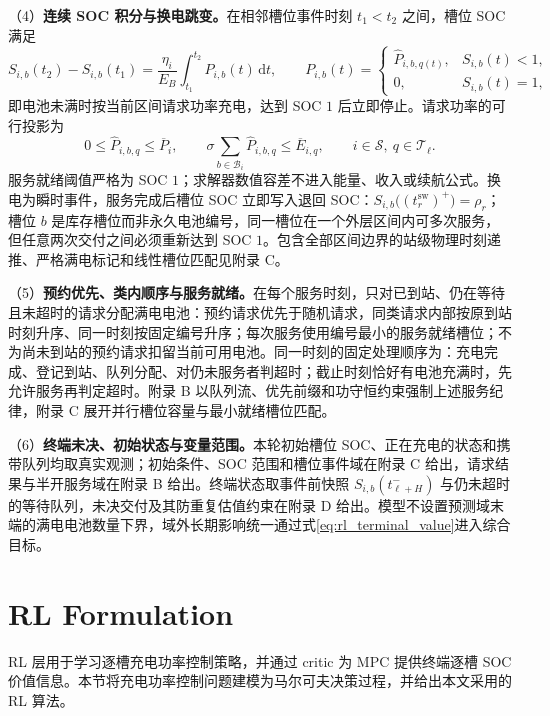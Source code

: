 \documentclass[12pt,a4paper,UTF8]{ctexart}
\begin{document}
（4）\textbf{连续 SOC 积分与换电跳变。}在相邻槽位事件时刻 $t_1<t_2$ 之间，槽位 SOC 满足
\begin{equation}
S_{i,b}(t_2)-S_{i,b}(t_1)
=
\frac{\eta_i}{E_B}
\int_{t_1}^{t_2}P_{i,b}(t)\,\mathrm dt,
\qquad
P_{i,b}(t)=
\begin{cases}
\widehat P_{i,b,q(t)},&S_{i,b}(t)<1,\\
0,&S_{i,b}(t)=1,
\end{cases}
\label{eq:event_charging_transition}
\end{equation}
即电池未满时按当前区间请求功率充电，达到 SOC $1$ 后立即停止。请求功率的可行投影为
\begin{equation}
0\le \widehat P_{i,b,q}\le\overline P_i,
\qquad
\sigma\sum_{b\in\mathcal B_i}\widehat P_{i,b,q}
\le\overline E_{i,q},
\qquad i\in\mathcal S,\ q\in\mathcal T_\ell.
\label{eq:power_projection}
\end{equation}
服务就绪阈值严格为 SOC $1$；求解器数值容差不进入能量、收入或续航公式。换电为瞬时事件，服务完成后槽位 SOC 立即写入退回 SOC：$S_{i,b}\big((t_r^{\mathrm{sw}})^+\big)=\rho_r$；槽位 $b$ 是库存槽位而非永久电池编号，同一槽位在一个外层区间内可多次服务，但任意两次交付之间必须重新达到 SOC $1$。包含全部区间边界的站级物理时刻递推、严格满电标记和线性槽位匹配见附录 C。

（5）\textbf{预约优先、类内顺序与服务就绪。}在每个服务时刻，只对已到站、仍在等待且未超时的请求分配满电电池：预约请求优先于随机请求，同类请求内部按原到站时刻升序、同一时刻按固定编号升序；每次服务使用编号最小的服务就绪槽位；不为尚未到站的预约请求扣留当前可用电池。同一时刻的固定处理顺序为：充电完成、登记到站、队列分配、对仍未服务者判超时；截止时刻恰好有电池充满时，先允许服务再判定超时。附录 B 以队列流、优先前缀和功守恒约束强制上述服务纪律，附录 C 展开并行槽位容量与最小就绪槽位匹配。

（6）\textbf{终端未决、初始状态与变量范围。}本轮初始槽位 SOC、正在充电的状态和携带队列均取真实观测；初始条件、SOC 范围和槽位事件域在附录 C 给出，请求结果与半开服务域在附录 B 给出。终端状态取事件前快照 $S_{i,b}(t_{\ell+H}^{-})$ 与仍未超时的等待队列，未决交付及其防重复估值约束在附录 D 给出。模型不设置预测域末端的满电电池数量下界，域外长期影响统一通过式\eqref{eq:rl_terminal_value}进入综合目标。



\section{RL Formulation}

RL 层用于学习逐槽充电功率控制策略，并通过 critic 为 MPC 提供终端逐槽 SOC 价值信息。本节将充电功率控制问题建模为马尔可夫决策过程，并给出本文采用的 RL 算法。
\end{document}
